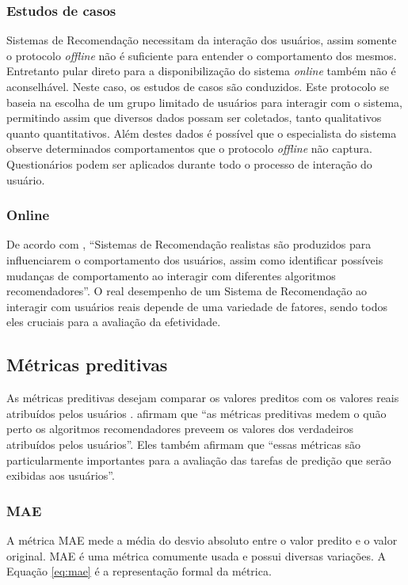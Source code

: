 \subsubsection{Estudos de casos}
Sistemas de Recomendação necessitam da interação dos usuários, assim somente o protocolo \textit{offline} não é suficiente para entender o comportamento dos mesmos. Entretanto pular direto para a disponibilização do sistema \textit{online} também não é aconselhável. Neste caso, os estudos de casos são conduzidos. Este protocolo se baseia na escolha de um grupo limitado de usuários para interagir com o sistema, permitindo assim que diversos dados possam ser coletados, tanto qualitativos quanto quantitativos. Além destes dados é possível que o especialista do sistema observe determinados comportamentos que o protocolo \textit{offline} não captura. Questionários podem ser aplicados durante todo o processo de interação do usuário.

\subsubsection{Online}
De acordo com , ``Sistemas de Recomendação realistas são produzidos para influenciarem o comportamento dos usuários, assim como identificar possíveis mudanças de comportamento ao interagir com diferentes algoritmos recomendadores''. O real desempenho de um Sistema de Recomendação ao interagir com usuários reais depende de uma variedade de fatores, sendo todos eles cruciais para a avaliação da efetividade.

\subsection{Métricas preditivas}
\label{sec:error_metrics}
As métricas preditivas desejam comparar os valores preditos com os valores reais atribuídos pelos usuários \cite{Celma:2008}.  afirmam que ``as métricas preditivas medem o quão perto os algoritmos recomendadores preveem os valores dos verdadeiros atribuídos pelos usuários''. Eles também afirmam que ``essas métricas são particularmente importantes para a avaliação das tarefas de predição que serão exibidas aos usuários''.

\subsubsection{MAE}
A métrica \ac{MAE} mede a média do desvio absoluto entre o valor predito e o valor original. \ac{MAE} é uma métrica comumente usada e possui diversas variações. A Equação \ref{eq:mae} é a representação formal da métrica.


